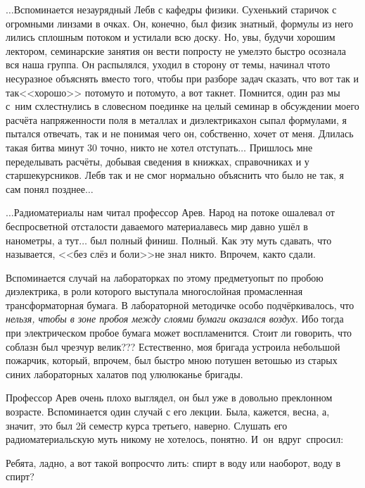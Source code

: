 $\ldots$Вспоминается незаурядный Леб\sdash в с кафедры физики. Сухенький старичок с огромными линзами в очках. Он, конечно, был физик знатный, формулы из него лились сплошным потоком и устилали всю доску. Но, увы, будучи хорошим лектором, семинарские занятия он вести попросту не умел\mdash это быстро осознала вся наша группа. Он распылялся, уходил в сторону от темы, начинал что\sdash то несуразное объяснять вместо того, чтобы при разборе задач сказать, что вот так и так\mdash <<хорошо>> потому\sdash то и потому\sdash то, а вот так\mdash нет. Помнится, один раз мы с~ним схлестнулись в словесном поединке на целый семинар в обсуждении моего расчёта напряженности поля в металлах и диэлектриках\mdash он сыпал формулами, я пытался отвечать, так и не понимая чего он, собственно, хочет от меня. Длилась такая битва минут 30 точно, никто не хотел отступать$\ldots$ Пришлось мне переделывать расчёты, добывая сведения в книжках, справочниках и у старшекурсников. Леб\sdash в так и не смог нормально объяснить что было не так, я сам понял позднее$\ldots$

\vspace{1.0cm}

$\ldots$Радиоматериалы нам читал профессор Ар\sdash ев. Народ на потоке ошалевал от беспросветной отсталости даваемого материала\mdash весь мир давно ушёл в нанометры, а тут$\ldots$ был полный финиш. Полный. Как эту муть сдавать, что называется, <<без слёз и боли>>\mdash не знал никто. Впрочем, как\sdash то сдали. 

Вспоминается случай на лабораторках по этому предмету\mdash опыт по пробою диэлектрика, в роли которого выступала многослойная промасленная трансформаторная бумага. В лабораторной методичке особо подчёркивалось, что \textit{нельзя, чтобы в зоне пробоя между слоями бумаги оказался воздух}. Ибо тогда при электрическом пробое бумага может воспламенится. Стоит ли говорить, что соблазн был чрезчур велик??? Естественно, моя бригада устроила небольшой пожарчик, который, впрочем, был быстро мною потушен ветошью из старых синих лабораторных халатов под улюлюканье бригады.

Профессор Ар\sdash ев очень плохо выглядел, он был уже в довольно преклонном возрасте. Вспоминается один случай с его лекции. Была, кажется, весна, а, значит, это был 2\sdash й семестр курса третьего, наверно. Слушать его радиоматериальскую муть никому не хотелось, понятно. И~он~вдруг~спросил:

\diagdash Ребята, ладно, а вот такой вопрос\mdash что лить: спирт в воду или наоборот, воду в спирт?

